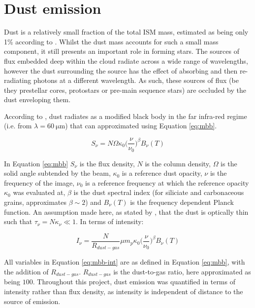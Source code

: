 \documentclass{report}
\begin{document}
\section{Dust emission}
Dust is a relatively small fraction of the total ISM mass, estimated as being only 1\% according to \textcite{noise}. Whilst the dust mass accounts for such a small mass component, it still presents an important role in forming stars. The sources of flux embedded deep within the cloud radiate across a wide range of wavelengths, however the dust surrounding the source has the effect of absorbing and then re-radiating photons at a different wavelength. As such, these sources of flux (be they prestellar cores, protostars or pre-main sequence stars) are occluded by the dust enveloping them.

According to \textcite{noise}, dust radiates as a modified black body in the far infra-red regime (i.e. from $\lambda=\SI{60}{\micro\meter}$) that can approximated using Equation \ref{eq:mbb}.

\begin{equation} \label{eq:mbb}
  S_{\nu} = N \Omega \kappa_{0} \Big(\frac{\nu}{\nu_{0}}\Big)^{\beta} B_{\nu}(T)
\end{equation}

In Equation \ref{eq:mbb} $S_{\nu}$ is the flux density, $N$ is the column density, $\Omega$ is the solid angle subtended by the beam, $\kappa_{0}$ is a reference dust opacity, $\nu$ is the frequency of the image, $\nu_{0}$ is a reference frequency at which the reference opacity $\kappa_{0}$ was evaluated at, $\beta$ is the dust spectral index (for siliciate and carbonaceous grains, \textcite{beta} approximates $\beta \sim 2$) and $B_{\nu}(T)$ is the frequency dependent Planck function. An assumption made here, as stated by \textcite{kelly}, that the dust is optically thin such that
$\tau_{\nu} = N\kappa_{\nu} \ll 1$. In terms of intensity:

\begin{equation} \label{eq:mbb-int}
  I_{\nu} = \frac{N}{R_{dust-gas}} \mu m_{p} \kappa_{0} \Big(\frac{\nu}{\nu_{0}}\Big)^{\beta} B_{\nu}(T)
\end{equation}

All variables in Equation \ref{eq:mbb-int} are as defined in Equation \ref{eq:mbb}, with the addition of $R_{dust-gas}$. $R_{dust-gas}$ is the dust-to-gas ratio, here approximated as being $100$. Throughout this project, dust emission was quantified in terms of intensity rather than flux density, as intensity is independent of distance to the source of emission.
\end{document}

